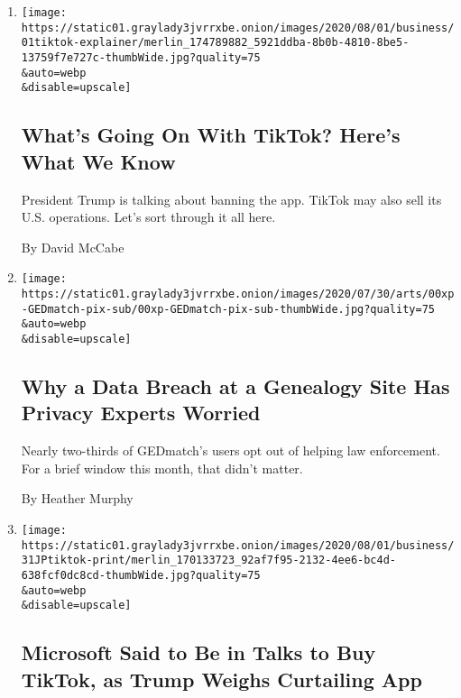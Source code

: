 \begin{enumerate}
\def\labelenumi{\arabic{enumi}.}
\item
  \href{/2020/08/01/technology/tiktok-trump-microsoft-bytedance-china-ban.html}{}

  \texttt{[image: https://static01.graylady3jvrrxbe.onion/images/2020/08/01/business/01tiktok-explainer/merlin\_174789882\_5921ddba-8b0b-4810-8be5-13759f7e727c-thumbWide.jpg?quality=75\\\&auto=webp\\\&disable=upscale]}

  \hypertarget{whats-going-on-with-tiktok-heres-what-we-know}{%
  \subsection{What's Going On With TikTok? Here's What We
  Know}\label{whats-going-on-with-tiktok-heres-what-we-know}}

  President Trump is talking about banning the app. TikTok may also sell
  its U.S. operations. Let's sort through it all here.

  By David McCabe
\item
  \href{/2020/08/01/technology/gedmatch-breach-privacy.html}{}

  \texttt{[image: https://static01.graylady3jvrrxbe.onion/images/2020/07/30/arts/00xp-GEDmatch-pix-sub/00xp-GEDmatch-pix-sub-thumbWide.jpg?quality=75\\\&auto=webp\\\&disable=upscale]}

  \hypertarget{why-a-data-breach-at-a-genealogy-site-has-privacy-experts-worried}{%
  \subsection{Why a Data Breach at a Genealogy Site Has Privacy Experts
  Worried}\label{why-a-data-breach-at-a-genealogy-site-has-privacy-experts-worried}}

  Nearly two-thirds of GEDmatch's users opt out of helping law
  enforcement. For a brief window this month, that didn't matter.

  By Heather Murphy
\item
  \href{/2020/07/31/technology/tiktok-microsoft.html}{}

  \texttt{[image: https://static01.graylady3jvrrxbe.onion/images/2020/08/01/business/31JPtiktok-print/merlin\_170133723\_92af7f95-2132-4ee6-bc4d-638fcf0dc8cd-thumbWide.jpg?quality=75\\\&auto=webp\\\&disable=upscale]}

  \hypertarget{microsoft-said-to-be-in-talks-to-buy-tiktok-as-trump-weighs-curtailing-app}{%
  \subsection{Microsoft Said to Be in Talks to Buy TikTok, as Trump
  Weighs Curtailing
  App}\label{microsoft-said-to-be-in-talks-to-buy-tiktok-as-trump-weighs-curtailing-app}}


\end{enumerate}
